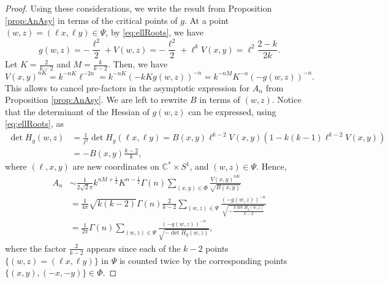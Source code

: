 \documentclass[english]{ourlematemasingle}
\numberwithin{theorem}{section}
\theoremstyle{remark}
\newcommand{\C}{\mathbb{C}}
\begin{document}
\begin{proof}
    Using these considerations, we write the result from Proposition \ref{prop:AnAsy} in terms of the critical points of $g$. 
    At a point $(w,z) = (\ell x, \ell y)\in \Psi$, by \eqref{eq:ellRoots}, we have
    \begin{equation}
    \label{eq:gAsEll}
    g(w,z) = -\frac{\ell^2}{2} + V(w,z) = -\frac{\ell^2}{2} + \ell^k V(x,y) = \ell^2 \frac{2-k}{2k}.
    \end{equation}
    Let $K = \frac{2}{k-2}$ and $M=\frac{k}{k-2}$. Then, we have
    \[
    V(x,y)^{nK} = k^{-nK} \ell^{-2n} = k^{-nK} (-kKg(w,z))^{-n} = k^{-nM} K^{-n} (-g(w,z))^{-n}.
    \]
    This allows to cancel pre-factors in the asymptotic expression for $A_n$ from Proposition \ref{prop:AnAsy}. 
    We are left to rewrite $B$ in terms of $(w,z)$. 
    Notice that the determinant of the Hessian of $g(w,z)$ can be expressed, using \eqref{eq:ellRoots}, as 
    \begin{align*}
    \det H_g(w,z) &= \frac{1}{\ell^2} \det H_g(\ell x, \ell y) = B(x,y)\ell^{k-2} V(x,y) (1-k(k-1)\ell^{k-2}V(x,y))\\
    &= -B(x,y)\frac{k-2}{k},
    \end{align*}
    where $(\ell, x, y)$ are new coordinates on $\C^*\times S^1$, and $(w,z) \in \Psi$.
    Hence,
    \begin{align*}
        A_n &\sim
        \frac{1}{2\sqrt{2}\pi}k^{nM+\frac{1}{2}}K^{n-\frac{1}{2}}\Gamma(n) 
        \sum\limits_{(x,y) \in \Phi} \frac{V(x,y)^{nK}}{\sqrt{B(x,y)}} \\
        &= \frac{1}{4\pi} \sqrt{k(k-2)} \Gamma(n) \frac{2}{k-2} \sum\limits_{(w,z) \in \Psi} \frac{(-g(w,z))^{-n}}{\sqrt{-\frac{k \det H_g(w,z)}{k-2}}}\\
        & = \frac{1}{2\pi} \Gamma(n) \sum\limits_{(w,z) \in \Psi} \frac{(-g(w,z))^{-n}}{\sqrt{-\det H_g(w,z)}},
    \end{align*}
    where the factor $\frac{2}{k-2}$ appears since each of the $k-2$ points $\{(w,z) = (\ell x, \ell y)\}$ in $\Psi$ is counted twice by the corresponding points $\{(x,y),(-x,-y)\}\in\Phi$.
\end{proof}
\end{document}
